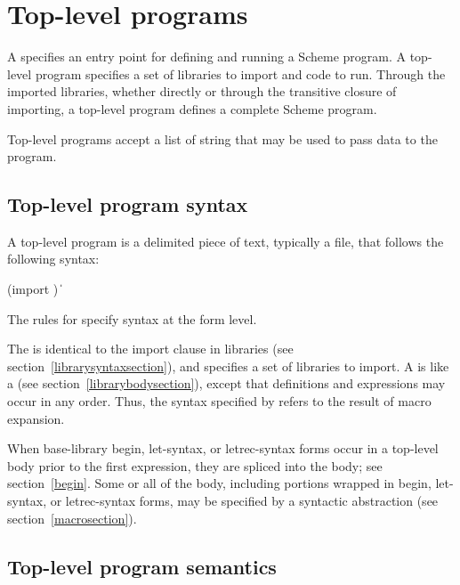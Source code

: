 \chapter{Top-level programs}
\label{programchapter}

A  specifies an entry point for defining and running
a Scheme program.  A top-level program specifies a set of libraries to import and
code to run.  Through the imported libraries, whether directly or through the
transitive closure of importing, a top-level program defines a complete Scheme
program.

Top-level programs accept
a list of string  that may be used to
pass data to the program.

\section{Top-level program syntax}
\label{programsyntaxsection}

A top-level program is a delimited piece of text, typically a file, that follows
the following syntax:
%
\begin{grammar}
 \:  
 \: (import )
 \: 
 \:  \| 
\end{grammar}
%
The rules for  specify syntax at the form level.

The  is identical to the import clause in
libraries (see section~\ref{librarysyntaxsection}), 
and specifies a set of libraries to import.  A  is like a  (see
section~\ref{librarybodysection}), except that 
definitions and expressions may occur in any order.  Thus, the syntax
specified by  refers to the result of macro
expansion.

When base-library {\cf begin}, {\cf let-syntax}, or {\cf letrec-syntax} forms
occur in a top-level body prior to the first
expression, they are spliced into the body; see section~\ref{begin}.
Some or all of the body, including portions wrapped in {\cf begin},
{\cf let-syntax}, or {\cf letrec-syntax}
forms, may be specified by a syntactic abstraction
(see section~\ref{macrosection}).

\section{Top-level program semantics}

